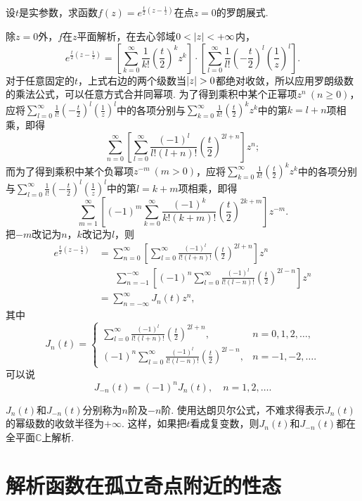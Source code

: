 \begin{example}
\def\fe{e^{\frac{t}{2} \left(z-\frac{1}{z}\right)}}
设\(t\)是实参数，求函数\(f(z) = \fe\)在点\(z=0\)的罗朗展式.
\def\s#1{\sum\limits_{#1}^{\infty}}%
\def\sk{\s{k=0} \frac{1}{k!} \left(\frac{t}{2}\right)^k z^k}%
\def\sl{\s{l=0} \frac{1}{l!} \left(-\frac{t}{2}\right)^l \left(\frac{1}{z}\right)^l}%
\begin{solution}[解法一]
除\(z=0\)外，\(f\)在\(z\)平面解析，在去心邻域\(0<\abs{z}<+\infty\)内，\[
\fe = \left[ \sk \right] \cdot \left[ \sl \right].
\]对于任意固定的\(t\)，上式右边的两个级数当\(\abs{z}>0\)都绝对收敛，所以应用罗朗级数的乘法公式，可以任意方式合并同幂项.
为了得到乘积中某个正幂项\(z^n\ (n\geqslant0)\)，应将\(\sl\)中的各项分别与\(\sk\)中的第\(k=l+n\)项相乘，即得\[
\s{n=0} \left[ \s{l=0} \frac{(-1)^l}{l!(l+n)!} \left(\frac{t}{2}\right)^{2l+n} \right] z^n;
\]而为了得到乘积中某个负幂项\(z^{-m}\ (m>0)\)，应将\(\sk\)中的各项分别与\(\sl\)中的第\(l=k+m\)项相乘，即得\[
\s{m=1} \left[ (-1)^m \s{k=0} \frac{(-1)^k}{k! (k+m)!} \left(\frac{t}{2}\right)^{2k+m} \right] z^{-m}.
\]把\(-m\)改记为\(n\)，\(k\)改记为\(l\)，则\begin{align*}
\fe &= \s{n=0} \left[ \s{l=0} \frac{(-1)^l}{l!(l+n)!} \left(\frac{t}{2}\right)^{2l+n} \right] z^n \\
&\hspace{20pt} \sum\limits_{n=-1}^{-\infty} \left[ (-1)^n \s{l=0} \frac{(-1)^l}{l!(l-n)!} \left(\frac{t}{2}\right)^{2l-n} \right] z^n \\
&= \sum\limits_{n=-\infty}^{\infty} J_n(t) z^n,
\end{align*}其中\begin{equation}
J_n(t) = \left\{ \begin{array}{rl}
\s{l=0} \frac{(-1)^l}{l!(l+n)!} \left(\frac{t}{2}\right)^{2l+n}, & n=0,1,2,\dotsc, \\
(-1)^n \s{l=0} \frac{(-1)^l}{l!(l-n)!} \left(\frac{t}{2}\right)^{2l-n}, & n=-1,-2,\dotsc.
\end{array} \right.
\end{equation}
可以说\[
J_{-n}(t) = (-1)^n J_n(t), \quad n=1,2,\dotsc.
\]

\(J_n(t)\)和\(J_{-n}(t)\)分别称为\(n\)阶及\(-n\)阶.
使用达朗贝尔公式，不难求得表示\(J_n(t)\)的幂级数的收敛半径为\(+\infty\).
这样，如果把\(t\)看成复变数，则\(J_n(t)\)和\(J_{-n}(t)\)都在全平面\(\mathbb{C}\)上解析.
\end{solution}
\end{example}

\section{解析函数在孤立奇点附近的性态}
